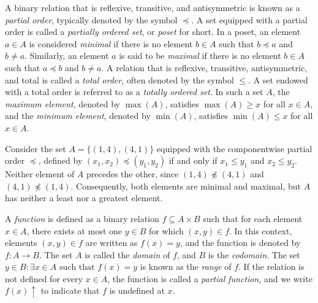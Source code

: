 A binary relation that is reflexive, transitive, and antisymmetric is known as a \emph{partial order}, typically denoted by the symbol $\preceq$. A set equipped with a partial order is called a \emph{partially ordered set}, or \emph{poset} for short. In a poset, an element $a \in A$ is considered \emph{minimal} if there is no element $b \in A$ such that $b \preceq a$ and $b \neq a$. Similarly, an element $a$ is said to be \emph{maximal} if there is no element $b \in A$ such that $a \preceq b$ and $b \neq a$. A relation that is reflexive, transitive, antisymmetric, and total is called a \emph{total order}, often denoted by the symbol $\leq$. A set endowed with a total order is referred to as a \emph{totally ordered set}. In such a set $A$, the \emph{maximum element}, denoted by $\max(A)$, satisfies $\max(A) \geq x$ for all $x \in A$, and the \emph{minimum element}, denoted by $\min(A)$, satisfies $\min(A) \leq x$ for all $x \in A$.

\begin{example}
Consider the set $A = \{(1,4), (4,1)\}$ equipped with the componentwise partial order $\preceq$, defined by $(x_1,x_2) \preceq (y_1,y_2)$ if and only if $x_1 \leq y_1$ and $x_2 \leq y_2$. Neither element of $A$ precedes the other, since $(1,4) \npreceq (4,1)$ and $(4,1) \npreceq (1,4)$. Consequently, both elements are minimal and maximal, but $A$ has neither a least nor a greatest element.
\end{example}


A \emph{function} is defined as a binary relation $f \subseteq A \times B$ such that for each element $x \in A$, there exists at most one $y \in B$ for which $\left(x, y\right) \in f$. In this context, elements $\left(x, y\right) \in f$ are written as $f(x) = y$, and the function is denoted by $f : A \rightarrow B$. The set $A$ is called the \emph{domain} of $f$, and $B$ is the \emph{codomain}. The set ${ y \in B : \exists x \in A \text{ such that } f(x) = y }$ is known as the \emph{range} of $f$. If the relation is not defined for every $x \in A$, the function is called a \emph{partial function}, and we write $f(x) \uparrow$ to indicate that $f$ is undefined at $x$.

